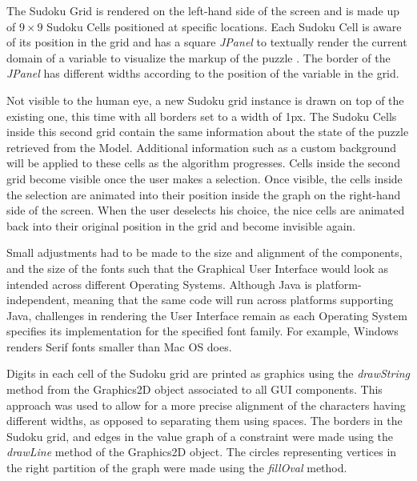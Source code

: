\documentclass{l4proj}
\begin{document}
\noindent The Sudoku Grid is rendered on the left-hand side of the screen and is made up of $9 \times 9$ Sudoku Cells positioned at specific locations. Each Sudoku Cell is aware of its position in the grid and has a square \textit{JPanel} to textually render the current domain of a variable to visualize the markup of the puzzle \cite{crook2009pencil}. The border of the \textit{JPanel} has different widths according to the position of the variable in the grid.

\noindent Not visible to the human eye, a new Sudoku grid instance is drawn on top of the existing one, this time with all borders set to a width of 1px. The Sudoku Cells inside this second grid contain the same information about the state of the puzzle retrieved from the Model. Additional information such as a custom background will be applied to these cells as the algorithm progresses. Cells inside the second grid become visible once the user makes a selection. Once visible, the cells inside the selection are animated into their position inside the graph on the right-hand side of the screen. When the user deselects his choice, the nice cells are animated back into their original position in the grid and become invisible again.

\noindent Small adjustments had to be made to the size and alignment of the components, and the size of the fonts such that the Graphical User Interface would look as intended across different Operating Systems. Although Java is platform-independent, meaning that the same code will run across platforms supporting Java, challenges in rendering the User Interface remain as each Operating System specifies its implementation for the specified font family. For example, Windows renders Serif fonts smaller than Mac OS does.

\noindent Digits in each cell of the Sudoku grid are printed as graphics using the \textit{drawString} method from the Graphics2D object associated to all GUI components. This approach was used to allow for a more precise alignment of the characters having different widths, as opposed to separating them using spaces. The borders in the Sudoku grid, and edges in the value graph of a constraint were made using the \textit{drawLine} method of the Graphics2D object. The circles representing vertices in the right partition of the graph were made using the \textit{fillOval} method.
\end{document}
